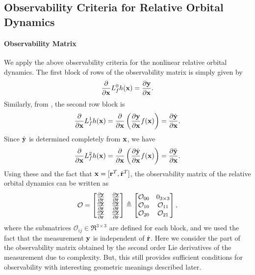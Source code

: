 \subsection{Observability Criteria for Relative Orbital Dynamics}

\paragraph{Observability Matrix}
We apply the above observability criteria for the nonlinear relative orbital dynamics. The first block of rows of the observability matrix is simply given by
\begin{align*}
\frac{\partial }{\partial \mathbf{x}} L_f^0 h(\mathbf{x}) = \frac{\partial \mathbf{y}}{\partial \mathbf{x}}.
\end{align*} 
Similarly, from , the second row block is
\begin{align*}
\frac{\partial }{\partial \mathbf{x}} L_f^1 h(\mathbf{x}) = \frac{\partial }{\partial \mathbf{x}}\left( \frac{\partial \mathbf{y}}{\partial \mathbf{x}}f(\mathbf{x}) \right)=\frac{\partial \dot{\mathbf{y}}}{\partial \mathbf{x}}.
\end{align*} 
Since $\dot{\mathbf{y}}$ is determined completely from $\mathbf{x}$, we have
\begin{align*}
\frac{\partial }{\partial \mathbf{x}} L_f^2 h(\mathbf{x}) = \frac{\partial }{\partial \mathbf{x}}\left( \frac{\partial \dot{\mathbf{y}}}{\partial \mathbf{x}}f(\mathbf{x}) \right)=\frac{\partial \ddot{\mathbf{y}}}{\partial \mathbf{x}}.
\end{align*}
Using these and the fact that $\mathbf{x}=[\mathbf{r}^T,\dot {\mathbf{r}}^T]$, the observability matrix of the relative orbital dynamics can be written as
\begin{align}
\mathcal{O} =
\begin{bmatrix}
\frac{\partial \mathbf{y}}{\partial \mathbf{r}} & \frac{\partial \mathbf{y}}{\partial \dot{\mathbf{r}}}\\
\frac{\partial \dot{\mathbf{y}}}{\partial \mathbf{r}} & \frac{\partial \dot{\mathbf{y}}}{\partial \dot{\mathbf{r}}}\\
\frac{\partial \ddot{\mathbf{y}}}{\partial \mathbf{r}} & \frac{\partial \ddot{\mathbf{y}}}{\partial \dot{\mathbf{r}}}
\end{bmatrix}
\triangleq
\begin{bmatrix}
\mathcal{O}_{00} & 0_{3\times 3}\\
\mathcal{O}_{10} & \mathcal{O}_{11}\\
\mathcal{O}_{20} & \mathcal{O}_{21}
\end{bmatrix},\label{eqn:OO}
\end{align}
where the submatrices $\mathcal{O}_{ij}\in\Re^{3\times 3}$ are defined for each block, and we used the fact that the measurement $\mathbf{y}$ is independent of $\dot{\mathbf{r}}$. Here we consider the part of the observability matrix obtained by the second order Lie derivatives of the measurement due to complexity. But, this still provides sufficient conditions for observability with interesting geometric meanings described later. 

